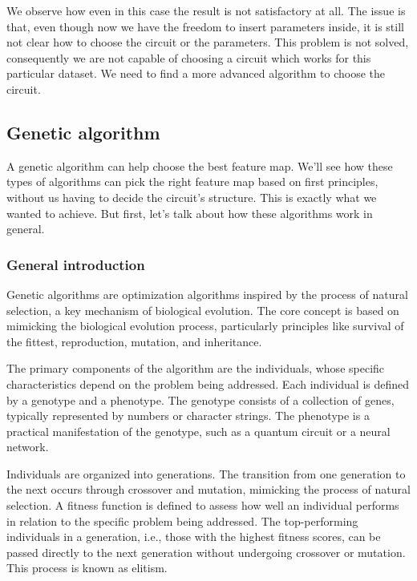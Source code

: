 \documentclass[12pt]{article}
\begin{document}
We observe how even in this case the result is not satisfactory at all. The issue is that, even though now we have the freedom to insert parameters inside, it is still not clear how to choose the circuit or the parameters. This problem is not solved, consequently we are not capable of choosing a circuit which works for this particular dataset. We need to find a more advanced algorithm to choose the circuit.




\subsection{Genetic algorithm}

A genetic algorithm can help choose the best feature map. We'll see how these types of algorithms can pick the right feature map based on first principles, without us having to decide the circuit's structure. This is exactly what we wanted to achieve. But first, let's talk about how these algorithms work in general.

\subsubsection{General introduction}

Genetic algorithms are optimization algorithms inspired by the process of natural selection, a key mechanism of biological evolution. The core concept is based on mimicking the biological evolution process, particularly principles like survival of the fittest, reproduction, mutation, and inheritance.

The primary components of the algorithm are the individuals, whose specific characteristics depend on the problem being addressed. Each individual is defined by a genotype and a phenotype. The genotype consists of a collection of genes, typically represented by numbers or character strings. The phenotype is a practical manifestation of the genotype, such as a quantum circuit or a neural network.

Individuals are organized into generations. The transition from one generation to the next occurs through crossover and mutation, mimicking the process of natural selection. A fitness function is defined to assess how well an individual performs in relation to the specific problem being addressed. The top-performing individuals in a generation, i.e., those with the highest fitness scores, can be passed directly to the next generation without undergoing crossover or mutation. This process is known as elitism.
\end{document}
